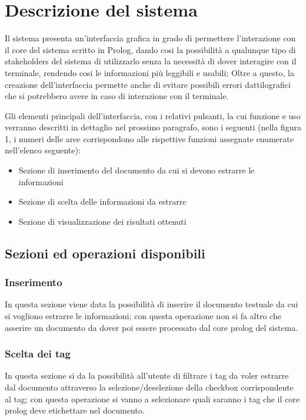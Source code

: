 \section{Descrizione del sistema}

Il sistema presenta un'interfaccia grafica in grado di permettere l'interazione con il core del sistema scritto in Prolog, dando cosi la possibilità a qualunque tipo di stakeholders del sistema di utilizzarlo senza la necessità di dover interagire con il terminale, rendendo cosi le informazioni più leggibili e usabili; Oltre a questo, la creazione dell'interfaccia permette anche di evitare possibili errori dattilografici che si potrebbero avere in caso di interazione con il terminale.

Gli elementi principali dell’interfaccia, con i relativi pulsanti, la cui funzione e uso verranno descritti in dettaglio nel prossimo paragrafo, sono i seguenti (nella figura 1, i numeri delle aree corrispondono alle rispettive funzioni assegnate enumerate
nell’elenco seguente):
\begin{itemize}
	\item Sezione di inserimento del documento da cui si devono estrarre le informazioni
	\item Sezione di scelta delle informazioni da estrarre
	\item Sezione di visualizzazione dei risultati ottenuti
\end{itemize}
\subsection{Sezioni ed operazioni disponibili}
    \subsubsection{Inserimento}
    \label{Inserimento}
    In questa sezione viene data la possibilità di inserire il documento testuale da cui si vogliono estrarre le informazioni; con questa operazione non si fa altro che asserire un documento da dover poi essere processato dal core prolog del sistema.
    \subsubsection{Scelta dei tag}
    \label{ChoiceTag}
    In questa sezione si da la possibilità all'utente di filtrare i tag da voler estrarre dal documento attraverso la selezione/deselezione della checkbox corrispondente al tag; con questa operazione si vanno a selezionare quali saranno i tag che il core prolog deve etichettare nel documento.
